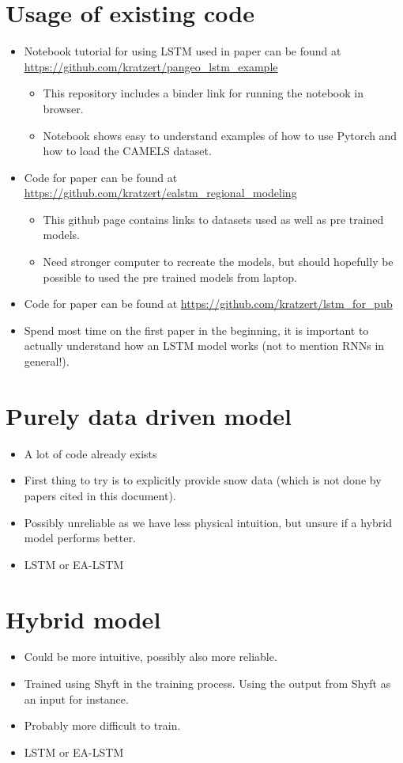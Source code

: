 \documentclass[a4paper,12pt,english]{article}
\begin{document}
\section*{Usage of existing code}
\begin{itemize}
\item Notebook tutorial for using LSTM used in paper \cite{lstm_first_paper} can be found at \url{https://github.com/kratzert/pangeo_lstm_example}
\begin{itemize}
\item This repository includes a binder link for running the notebook in browser.
\item Notebook shows easy to understand examples of how to use Pytorch and how to load the CAMELS dataset.
\end{itemize}
\item Code for paper \cite{lstm_second_paper} can be found at \url{https://github.com/kratzert/ealstm_regional_modeling}
\begin{itemize}
\item This github page contains links to datasets used as well as pre trained models. 
\item Need stronger computer to recreate the models, but should hopefully be possible to used the pre trained models from laptop.
\end{itemize}
\item Code for paper \cite{lstm_third_paper} can be found at \url{https://github.com/kratzert/lstm_for_pub}
\item Spend most time on the first paper in the beginning, it is important to actually understand how an LSTM model works (not to mention RNNs in general!).
\end{itemize}

\section*{Purely data driven model}
\begin{itemize}
\item A lot of code already exists
\item First thing to try is to explicitly provide snow data (which is not done by papers cited in this document).
\item Possibly unreliable as we have less physical intuition, but unsure if a hybrid model performs better.
\item LSTM or EA-LSTM
\end{itemize}

\section*{Hybrid model}
\begin{itemize}
\item Could be more intuitive, possibly also more reliable.
\item Trained using Shyft in the training process. Using the output from Shyft as an input for instance.
\item Probably more difficult to train.
\item LSTM or EA-LSTM
\end{itemize}



\end{document}
